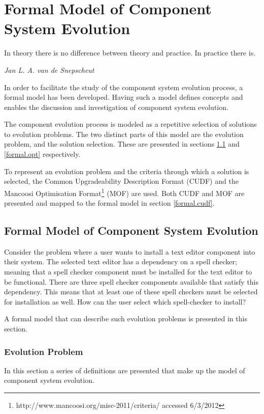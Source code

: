 \chapter{Formal Model of Component System Evolution}
\label{formal}
\epigraph{In theory there is no difference between theory and practice. In practice there is.}
{\textit{Jan L. A. van de Snepscheut}}
In order to facilitate the study of the component system evolution process, a formal model has been developed.
Having such a model defines concepts and enables the discussion and investigation of component system evolution.

The component evolution process is modeled as a repetitive selection of solutions to evolution problems.
The two distinct parts of this model are the evolution problem, and the solution selection.
These are presented in sections \ref{formal.step} and \ref{formal.opt} respectively.

To represent an evolution problem and the criteria through which a solution is selected,
the Common Upgradeability Description Format (CUDF) \citep{treinen2009common}
and the Mancoosi Optimisation Format\footnote{http://www.mancoosi.org/misc-2011/criteria/ accessed 6/3/2012} (MOF) are used.
Both CUDF and MOF are presented and mapped to the formal model in section \ref{formal.cudf}. 

\section{Formal Model of Component System Evolution}
\label{formal.step}
Consider the problem where a user wants to install a text editor component into their system.
The selected text editor has a dependency on a spell checker;
meaning that a spell checker component must be installed for the text editor to be functional.
There are three spell checker components available that satisfy this dependency.
This means that at least one of these spell checkers must be selected for installation as well.
How can the user select which spell-checker to install? 

A formal model that can describe such evolution problems is presented in this section.

\subsection{Evolution Problem}
In this section a series of definitions are presented that make up the model of component system evolution.

